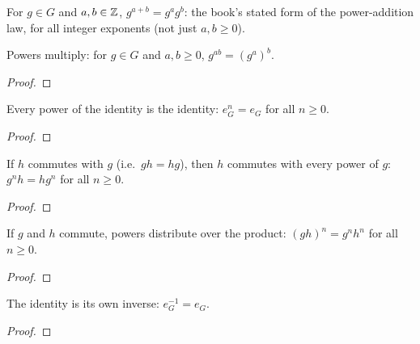 \begin{proposition}
  \label{prop:groups:gzpow-add}
  For $g \in G$ and $a, b \in \mathbb{Z}$, $g^{a+b} = g^a g^b$: the book's
  stated form of the power-addition law, for all integer exponents
  (not just $a, b \geq 0$).
\end{proposition}

\begin{proposition}
  \label{prop:groups:gpow-mul}
  \leanok
  Powers multiply: for $g \in G$ and $a, b \geq 0$, $g^{ab} = (g^a)^b$.
\end{proposition}
\begin{proof}
  \leanok
\end{proof}

\begin{proposition}
  \label{prop:groups:gpow-e}
  \leanok
  Every power of the identity is the identity: $e_G^n = e_G$ for all
  $n \geq 0$.
\end{proposition}
\begin{proof}
  \leanok
\end{proof}

\begin{proposition}
  \label{prop:groups:gpow-op-comm}
  \leanok
  If $h$ commutes with $g$ (i.e.\ $gh = hg$), then $h$ commutes with
  every power of $g$: $g^n h = h g^n$ for all $n \geq 0$.
\end{proposition}
\begin{proof}
  \leanok
\end{proof}

\begin{proposition}
  \label{prop:groups:gpow-op-of-comm}
  \leanok
  If $g$ and $h$ commute, powers distribute over the product:
  $(gh)^n = g^n h^n$ for all $n \geq 0$.
\end{proposition}
\begin{proof}
  \leanok
\end{proof}

\begin{proposition}
  \label{prop:groups:inv-e}
  \leanok
  The identity is its own inverse: $e_G^{-1} = e_G$.
\end{proposition}
\begin{proof}
  \leanok
\end{proof}

